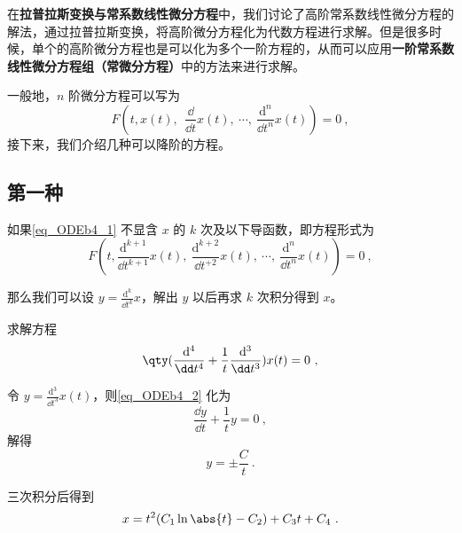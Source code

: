 

在\textbf{拉普拉斯变换与常系数线性微分方程}中，我们讨论了高阶常系数线性微分方程的解法，通过拉普拉斯变换，将高阶微分方程化为代数方程进行求解。但是很多时候，单个的高阶微分方程也是可以化为多个一阶方程的，从而可以应用\textbf{一阶常系数线性微分方程组（常微分方程）}中的方法来进行求解。

一般地，$n$ 阶微分方程可以写为
\begin{equation}\label{eq_ODEb4_1}
F(t, x(t),\ \ \frac{\dd}{\dd t}x(t),\ \cdots, \ \frac{\mathrm{d}^n}{\dd t^n}x(t))=0~,
\end{equation}
接下来，我们介绍几种可以降阶的方程。

\subsection{第一种}

如果\autoref{eq_ODEb4_1} 不显含 $x$ 的 $k$ 次及以下导函数，即方程形式为
\begin{equation}
F(t, \frac{\mathrm{d}^{k+1}}{\dd t^{k+1}}x(t),\ \frac{\mathrm{d}^{k+2}}{\dd t^{+2}}x(t),\ \cdots,\ \frac{\mathrm{d}^n}{\dd t^n}x(t))=0~,
\end{equation}

那么我们可以设 $y=\frac{\mathrm{d}^k}{\dd t^k}x$，解出 $y$ 以后再求 $k$ 次积分得到 $x$。


\begin{example}{}
求解方程
\begin{equation}\label{eq_ODEb4_2}
\qty(
    \frac{\mathrm{d}^4}{\dd t^4}+\frac{1}{t}\frac{\mathrm{d}^3}{\dd t^3}
    )
    x(t)=0~,
\end{equation}

令 $y=\frac{\mathrm{d}^3}{\dd t^3}x(t)$，则\autoref{eq_ODEb4_2} 化为
\begin{equation}
\frac{\dd y}{\dd t}+\frac{1}{t}y=0~,
\end{equation}
解得
\begin{equation}
y=\pm\frac{C}{t}~.
\end{equation}

三次积分后得到
\begin{equation}
x=t^2(C_1\ln\abs{t}-C_2)+C_3t+C_4~.
\end{equation}



\end{example}


